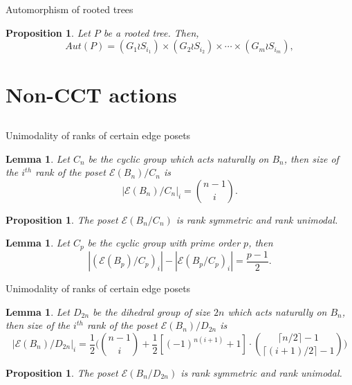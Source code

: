 \documentclass{beamer}
\newtheorem{lem}[thm]{Lemma}
\newtheorem{prop}[thm]{Proposition}
\theoremstyle{remark}
\begin{document}
\begin{frame}{Automorphism of rooted trees}
\begin{prop}
Let $P$ be a rooted tree. Then, 
$$Aut(P) = (G_1 \wr S_{i_1}) \times (G_2 \wr S_{i_2}) \times \cdots \times (G_m\wr S_{i_m}),$$
\end{prop}
\end{frame}










\section{Non-CCT actions}
\subsection{}

\begin{frame}{Unimodality of ranks of certain edge posets}
\begin{lem}
Let $C_n$ be the cyclic group which acts naturally on $B_n$, then size of the $i^{th}$ rank of the poset $\mathcal E (B_n)/C_n$ is $$|\mathcal E (B_n)/C_n|_{i} = \binom{n-1}{i}.$$
\end{lem}
\pause
\begin{prop}
The poset $\mathcal E (B_n/C_n)$ is rank symmetric and rank unimodal.
\end{prop}
\pause
\begin{lem}
Let $C_p$ be the cyclic group with prime order $p$, then  $$|(\mathcal E (B_p)/C_p)_i| - |\mathcal E(B_p/C_p)_i| = \frac{p-1}{2}.$$
\end{lem}
\end{frame}






\begin{frame}{Unimodality of ranks of certain edge posets}
\begin{lem}
Let $D_{2n}$ be the dihedral group of size $2n$ which acts naturally on $B_n$, then size of the $i^{th}$ rank of the poset $\mathcal E (B_n)/D_{2n}$ is
$$|\mathcal E (B_n)/D_{2n}|_{i}  = \frac{1}{2} \Big( {n-1 \choose i } + \frac{1}{2} [(-1)^{n(i+1)}+1] \cdot { \lceil n/2\rceil -1  \choose \lceil (i+1)/2 \rceil - 1}  \Big)$$
\end{lem}
\pause
\begin{prop}
The poset $\mathcal E (B_n/D_{2n})$ is rank symmetric and rank unimodal.
\end{prop}
\end{frame}
\end{document}
